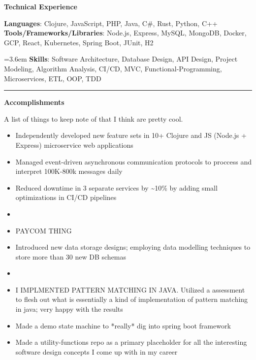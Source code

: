 \documentclass[letterpaper,11pt]{article}
\newcommand{\resumeItem}[1]{
  \item\small{
    {#1 \vspace{-2pt}}
  }
}
\newcommand{\resumeItemListStart}{\begin{itemize}}
\newcommand{\resumeItemListEnd}{\end{itemize}\vspace{-5pt}}
\begin{document}
%
\textbf{\large \textcolor{magic_blue}{Technical Experience} }
\begin{onehalfspace}

	\textbf{ Languages}{: Clojure, JavaScript, PHP, Java, C\#, Rust, Python, C++ } \\

	\textbf{ Tools/Frameworks/Libraries}{: Node.js, Express, MySQL, MongoDB, Docker, GCP, React, Kubernetes, Spring Boot, JUnit, H2 } \\
\end{onehalfspace}

\hangindent=3.6em
\textbf{ Skills}{: }
Software Architecture, Database Design, API Design,
Project Modeling, Algorithm Analysis, CI/CD,
MVC, Functional-Programming, Microservices, ETL, OOP,
TDD

\noindent\rule{19.5cm}{0.4pt}


\textbf{\large \textcolor{magic_blue}{Accomplishments} }

A list of things to keep note of that I think are pretty cool.

\resumeItemListStart

\resumeItem{ Independently developed new feature sets in 10+ Clojure and JS (Node.js + Express) microservice web applications}
\resumeItem{ Managed event-driven asynchronous communication protocols to proccess and interpret 100K-800k messages daily}
\resumeItem{ Reduced downtime in 3 separate services by \textasciitilde10\% by adding small optimizations in CI/CD pipelines }

\resumeItem{ ~~~\newline }

\resumeItem{ PAYCOM THING}
\resumeItem{ Introduced new data storage designs; employing data modelling techniques to store more than 30 new DB schemas}

\resumeItem{ ~~~\newline }

\resumeItem{ I IMPLMENTED PATTERN MATCHING IN JAVA. Utilized a assessment to flesh out what is
	essentially a kind of implementation of pattern matching
	in java; very happy with the results }
\resumeItemListEnd

\resumeItemListStart
\resumeItem{ Made a demo state machine to *really* dig
	into spring boot framework }
\resumeItemListEnd

\resumeItemListStart
\resumeItem{ Made a utility-functions repo as a primary
	placeholder for all the interesting software design concepts
	I come up with in my career }
\resumeItemListEnd
\end{document}
